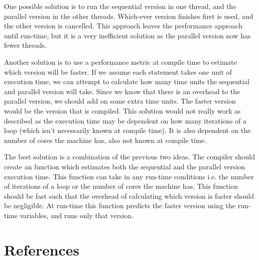 \documentclass[conference]{IEEEtran}
\begin{document}
One possible solution is to run the sequential version in one thread, and the parallel version in the other threads. Which-ever version finishes first is used, and the other version is cancelled. This approach leaves the performance approach until run-time, but it is a very inefficient solution as the parallel version now has fewer threads.

Another solution is to use a performance metric at compile time to estimate which version will be faster. If we assume each statement takes one unit of execution time, we can attempt to calculate how many time units the sequential and parallel version will take. Since we know that there is an overhead to the parallel version, we should add on some extra time units. The faster version would be the version that is compiled. This solution would not really work as described as the execution time may be dependent on how many iterations of a loop (which isn't necessarily known at compile time). It is also dependent on the number of cores the machine has, also not known at compile time.

The best solution is a combination of the previous two ideas. The compiler should create an function which estimates both the sequential and the parallel version execution time. This function can take in any run-time conditions i.e. the number of iterations of a loop or the number of cores the machine has. This function should be fast such that the overhead of calculating which version is faster should be negligible. At run-time this function predicts the faster version using the run-time variables, and runs only that version.

\section{References}
\printbibliography[heading=none]
\end{document}
